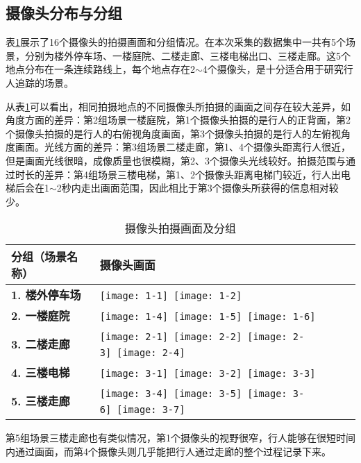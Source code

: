 \subsection{摄像头分布与分组}

表\ref{tab:cameraslayout}展示了16个摄像头的拍摄画面和分组情况。在本次采集的数据集中一共有5个场景，分别为楼外停车场、一楼庭院、二楼走廊、三楼电梯出口、三楼走廊。这5个地点分布在一条连续路线上，每个地点存在2$\sim$4个摄像头，是十分适合用于研究行人追踪的场景。

从表\ref{tab:cameraslayout}可以看出，相同拍摄地点的不同摄像头所拍摄的画面之间存在较大差异，如角度方面的差异：第2组场景一楼庭院，第1个摄像头拍摄的是行人的正背面，第2个摄像头拍摄的是行人的右俯视角度画面，第3个摄像头拍摄的是行人的左俯视角度画面。光线方面的差异：第3组场景二楼走廊，第1、4个摄像头距离行人很近，但是画面光线很暗，成像质量也很模糊，第2、3个摄像头光线较好。拍摄范围与通过时长的差异：第4组场景三楼电梯，第1、2个摄像头距离电梯门较近，行人出电梯后会在1$\sim$2秒内走出画面范围，因此相比于第3个摄像头所获得的信息相对较少。

\begin{table}[!ht]
\centering
\caption{摄像头拍摄画面及分组}
\label{tab:cameraslayout}
\renewcommand{\arraystretch}{1.5}%
\begin{tabularx}{\textwidth}{>{\centering\bfseries}m{} >{\centering\arraybackslash}m{}}
\toprule
分组（场景名称） & \textbf{摄像头画面} \\
\midrule
1. 楼外停车场 & \texttt{[image: 1-1]}~\texttt{[image: 1-2]} \\
2. 一楼庭院 & \texttt{[image: 1-4]}~\texttt{[image: 1-5]}~\texttt{[image: 1-6]} \\
3. 二楼走廊 & \texttt{[image: 2-1]}~\texttt{[image: 2-2]}~\texttt{[image: 2-3]}~\texttt{[image: 2-4]} \\
4. 三楼电梯 & \texttt{[image: 3-1]}~\texttt{[image: 3-2]}~\texttt{[image: 3-3]} \\
5. 三楼走廊 & \texttt{[image: 3-4]}~\texttt{[image: 3-5]}~\texttt{[image: 3-6]}~\texttt{[image: 3-7]} \\
\bottomrule
\end{tabularx}
\end{table}

第5组场景三楼走廊也有类似情况，第1个摄像头的视野很窄，行人能够在很短时间内通过画面，而第4个摄像头则几乎能把行人通过走廊的整个过程记录下来。

